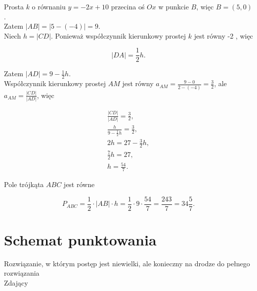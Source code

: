 \documentclass[10pt]{article}
\begin{document}
Prosta $k$ o równaniu $y=-2 x+10$ przecina oś $O x$ w punkcie $B$, więc $B=(5,0)$.\\
Zatem $|A B|=|5-(-4)|=9$.\\
Niech $h=|C D|$. Ponieważ współczynnik kierunkowy prostej $k$ jest równy -2 , więc

$$
|D A|=\frac{1}{2} h .
$$

Zatem $|A D|=9-\frac{1}{2} h$.\\
Współczynnik kierunkowy prostej $A M$ jest równy $a_{A M}=\frac{9-0}{2-(-4)}=\frac{3}{2}$, ale $a_{A M}=\frac{|C D|}{|A D|}$, więc

$$
\begin{gathered}
\frac{|C D|}{|A D|}=\frac{3}{2}, \\
\frac{h}{9-\frac{1}{2} h}=\frac{3}{2}, \\
2 h=27-\frac{3}{2} h, \\
\frac{7}{2} h=27, \\
h=\frac{54}{7} .
\end{gathered}
$$

Pole trójkąta $A B C$ jest równe

$$
P_{A B C}=\frac{1}{2} \cdot|A B| \cdot h=\frac{1}{2} \cdot 9 \cdot \frac{54}{7}=\frac{243}{7}=34 \frac{5}{7} .
$$

\section*{Schemat punktowania}
Rozwiązanie, w którym postęp jest niewielki, ale konieczny na drodze do pełnego rozwiązania\\
Zdający
\end{document}
